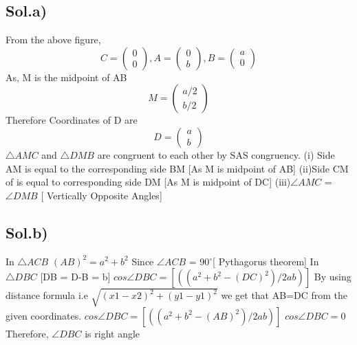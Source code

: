 \documentclass[journal,12pt,onecolumn]{IEEEtran}
\begin{document}
\subsection*{\textbf{Sol.a)}}
\begin{flushleft}
From the above figure,
$$
C=
\begin{pmatrix}
0\\
0
\end{pmatrix}
,A=
\begin{pmatrix}
0\\
b
\end{pmatrix}
,B=
\begin{pmatrix}
a\\
0
\end{pmatrix}
$$
As, M is the midpoint of AB
$$
M=
\begin{pmatrix}
a/2 \\
b/2 
\end{pmatrix}
$$
Therefore Coordinates of D are
$$
D=
\begin{pmatrix}
a\\
b
\end{pmatrix}
$$
\newline
\newline
$\triangle AMC$ and $\triangle DMB$ are congruent to each other by SAS congruency.
\newline
(i) Side AM  is equal to the corresponding side BM  [As M is midpoint of AB]
\newline
(ii)Side CM of is equal to corresponding side DM [As M is midpoint of DC]
\newline
(iii)$\angle AMC$ = $\angle DMB$ [ Vertically Opposite Angles]
\end{flushleft}
\subsection*{\textbf{Sol.b)}}
\begin{flushleft}

In $\triangle ACB$ 
\newline
$(AB)^2=a^2+b^2$   Since $\angle ACB$ = 90$^{\circ}$[ Pythagorus theorem]
\newline
\newline
In $\triangle DBC$  [DB = D-B = b]  
\newline
\newline
$cos \angle DBC = [((a^2+b^2-(DC)^2)/2ab)]$ 
\newline
\newline
By using distance formula i.e $\sqrt{(x1-x2)^2+(y1-y1)^2}$ we get that AB=DC from the given coordinates.
\newline
$cos\angle DBC = [((a^2+b^2-(AB)^2)/2ab)]$
\newline
$cos\angle DBC=0$
\newline
Therefore, $\angle DBC$ is right angle
\end{flushleft}
\end{document}
